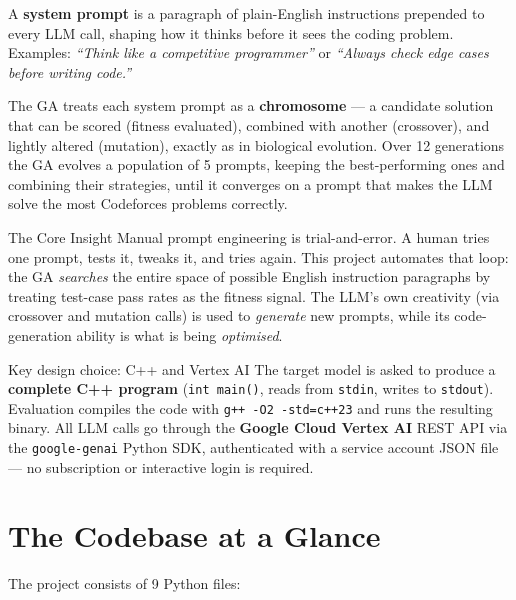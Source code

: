 \documentclass[11pt,a4paper]{report}
\newcommand{\fn}[1]{\texttt{#1}}
\begin{document}
A \textbf{system prompt} is a paragraph of plain-English instructions prepended to every
LLM call, shaping how it thinks before it sees the coding problem.
Examples: \emph{``Think like a competitive programmer''} or \emph{``Always check edge
cases before writing code.''}

The GA treats each system prompt as a \textbf{chromosome} --- a candidate solution that
can be scored (fitness evaluated), combined with another (crossover), and lightly altered
(mutation), exactly as in biological evolution.  Over 12 generations the GA evolves a
population of 5 prompts, keeping the best-performing ones and combining their strategies,
until it converges on a prompt that makes the LLM solve the most Codeforces problems correctly.

\begin{conceptbox}{The Core Insight}
Manual prompt engineering is trial-and-error.  A human tries one prompt, tests it, tweaks
it, and tries again.  This project automates that loop: the GA \emph{searches} the entire
space of possible English instruction paragraphs by treating test-case pass rates as the
fitness signal.  The LLM's own creativity (via crossover and mutation calls) is used to
\emph{generate} new prompts, while its code-generation ability is what is being
\emph{optimised}.
\end{conceptbox}

\begin{conceptbox}{Key design choice: C++ and Vertex AI}
The target model is asked to produce a \textbf{complete C++ program} (\fn{int main()},
reads from \fn{stdin}, writes to \fn{stdout}).  Evaluation compiles the code with
\fn{g++ -O2 -std=c++23} and runs the resulting binary.  All LLM calls go through the
\textbf{Google Cloud Vertex AI} REST API via the \texttt{google-genai} Python SDK,
authenticated with a service account JSON file --- no subscription or interactive login
is required.
\end{conceptbox}

\section{The Codebase at a Glance}

The project consists of 9 Python files:
\end{document}

